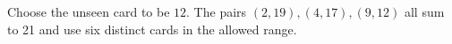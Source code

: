 Choose the unseen card to be $\boxed{12}$. The pairs $(2,19),(4,17),(9,12)$ all sum to 21 and use six distinct cards in the allowed range.
